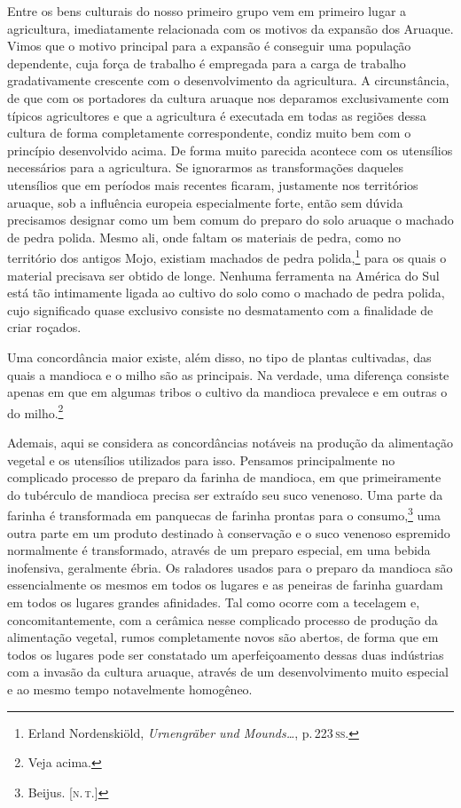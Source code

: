 Entre os bens culturais do nosso primeiro grupo vem em primeiro lugar a
agricultura, imediatamente relacionada com os motivos da expansão dos
Aruaque. Vimos que o motivo principal para a expansão é conseguir uma
população dependente, cuja força de trabalho é empregada para a carga de
trabalho gradativamente crescente com o desenvolvimento da agricultura.
A circunstância, de que com os portadores da cultura aruaque nos
deparamos exclusivamente com típicos agricultores e que a agricultura é
executada em todas as regiões dessa cultura de forma completamente
correspondente, condiz muito bem com o princípio desenvolvido acima. De
forma muito parecida acontece com os utensílios necessários para a
agricultura. Se ignorarmos as transformações daqueles utensílios que em
períodos mais recentes ficaram, justamente nos territórios aruaque, sob
a influência europeia especialmente forte, então sem dúvida precisamos
designar como um bem comum do preparo do solo aruaque o machado de pedra
polida. Mesmo ali, onde faltam os materiais de pedra, como no território
dos antigos Mojo, existiam machados de pedra polida,\footnote{Erland
  Nordenskiöld, \textit{Urnengräber und Mounds\ldots}, p.\,223\,\textsc{ss}.} 
  para os quais o material precisava ser obtido de
longe. Nenhuma ferramenta na América do Sul está tão intimamente ligada
ao cultivo do solo como o machado de pedra polida, cujo significado
quase exclusivo consiste no desmatamento com a finalidade de criar
roçados.

Uma concordância maior existe, além disso, no tipo de plantas
cultivadas, das quais a mandioca e o milho são as principais. Na
verdade, uma diferença consiste apenas em que em algumas tribos o
cultivo da mandioca prevalece e em outras o do milho.\footnote{Veja
  acima.}

Ademais, aqui se considera as concordâncias notáveis na produção da
alimentação vegetal e os utensílios utilizados para isso. Pensamos
principalmente no complicado processo de preparo da farinha de
mandioca, em que primeiramente do tubérculo de mandioca precisa ser
extraído seu suco venenoso. Uma parte da farinha é transformada em
panquecas de farinha prontas para o consumo,\footnote{Beijus. {[}\textsc{n.\,t.}{]}} uma
outra parte em um produto destinado à conservação e o suco venenoso
espremido normalmente é transformado, através de um preparo especial, em
uma bebida inofensiva, geralmente ébria. Os raladores usados para o
preparo da mandioca são essencialmente os mesmos em todos os lugares e
as peneiras de farinha guardam em todos os lugares grandes afinidades.
Tal como ocorre com a tecelagem e, concomitantemente, com a cerâmica
nesse complicado processo de produção da alimentação vegetal, rumos
completamente novos são abertos, de forma que em todos os lugares pode
ser constatado um aperfeiçoamento dessas duas indústrias com a invasão
da cultura aruaque, através de um desenvolvimento muito especial e ao
mesmo tempo notavelmente homogêneo.

